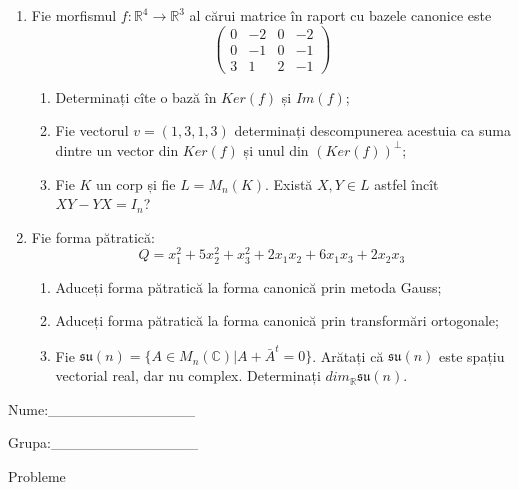 \documentclass{article}
\begin{document}
\begin{enumerate}
 \item Fie morfismul $f:\mathbb{R}^4 \to \mathbb{R}^3$ al cărui matrice în raport cu bazele canonice este
$$\begin{pmatrix}
0&-2&0&-2\\
0&-1&0&-1\\
3&1&2&-1
\end{pmatrix}$$

\begin{enumerate}
\item Determinați cîte o bază în $Ker(f)$ și $Im(f)$;
\item Fie vectorul $v=(1,3,1,3)$ determinați descompunerea acestuia ca suma dintre un vector din $Ker(f)$ și unul din $(Ker(f))^\perp$;
\item Fie $K$ un corp și fie $L=M_n(K)$. Există $X,Y \in L$ astfel încît $XY-YX=I_n$?  
\end{enumerate}
\item Fie forma pătratică:
$$Q= x_1^2+5x_2^2+x_3^2+2x_1x_2+6x_1x_3+2x_2x_3$$

\begin{enumerate}
\item Aduceți forma pătratică la forma canonică prin metoda Gauss;
\item Aduceți forma pătratică la forma canonică prin transformări ortogonale;
\item Fie $\mathfrak{su}(n)=\{ A \in M_n(\mathbb{C}) | A+\bar{A}^t=0\}$. Arătați că $\mathfrak{su}(n)$ este spațiu vectorial real, dar nu complex.
Determinați $dim_{\mathbb{R}}\mathfrak{su}(n)$.
\end{enumerate}
\end{enumerate}
\newpage
\begin{flushright}
Nume:\_\_\_\_\_\_\_\_\_\_\_\_\_\_
 
 
Grupa:\_\_\_\_\_\_\_\_\_\_\_\_\_\_
\end{flushright}
\begin{center}
\vspace{2cm}
{\Large Probleme}
\vspace{2cm}
\end{center}
\end{document}
